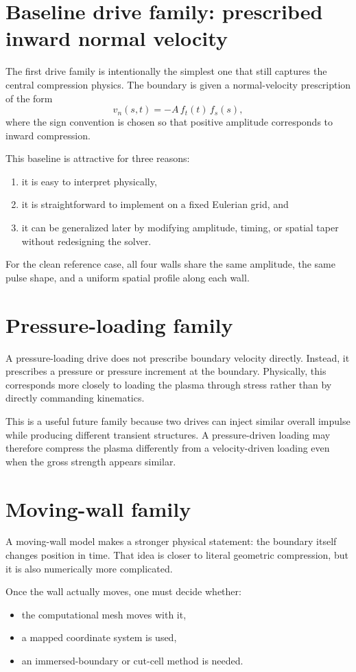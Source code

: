 \documentclass[11pt]{article}
\begin{document}
\section{Baseline drive family: prescribed inward normal velocity}
The first drive family is intentionally the simplest one that still captures the central compression physics. The boundary is given a normal-velocity prescription of the form
\[
 v_n(s,t) = -A\,f_t(t)\,f_s(s),
\]
where the sign convention is chosen so that positive amplitude corresponds to inward compression.

This baseline is attractive for three reasons:
\begin{enumerate}
    \item it is easy to interpret physically,
    \item it is straightforward to implement on a fixed Eulerian grid, and
    \item it can be generalized later by modifying amplitude, timing, or spatial taper without redesigning the solver.
\end{enumerate}

For the clean reference case, all four walls share the same amplitude, the same pulse shape, and a uniform spatial profile along each wall.

\section{Pressure-loading family}
A pressure-loading drive does not prescribe boundary velocity directly. Instead, it prescribes a pressure or pressure increment at the boundary. Physically, this corresponds more closely to loading the plasma through stress rather than by directly commanding kinematics.

This is a useful future family because two drives can inject similar overall impulse while producing different transient structures. A pressure-driven loading may therefore compress the plasma differently from a velocity-driven loading even when the gross strength appears similar.

\section{Moving-wall family}
A moving-wall model makes a stronger physical statement: the boundary itself changes position in time. That idea is closer to literal geometric compression, but it is also numerically more complicated.

Once the wall actually moves, one must decide whether:
\begin{itemize}
    \item the computational mesh moves with it,
    \item a mapped coordinate system is used,
    \item an immersed-boundary or cut-cell method is needed.
\end{itemize}
\end{document}
